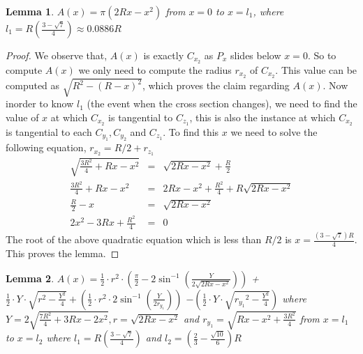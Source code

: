 \documentclass[conference]{IEEEtran}
\newtheorem{lemma}{Lemma}
\begin{document}
\begin{lemma}
$A(x) = \pi(2Rx - x^2)$ from $x = 0$ to $x = l_1$, where $l_1 = R(\frac{3 - \sqrt{7}}{4}) \approx 0.0886R$
\end{lemma}
\begin{proof}
We observe that, $A(x)$ is exactly $C_{x_2}$ as $P_x$ slides below $x = 0$. So to compute $A(x)$ we only need to compute 
the radius $r_{x_2}$ of $C_{x_2}$. This value can be computed as
$\sqrt{R^2 - (R-x)^2} $, which proves the claim regarding $A(x)$. Now inorder to know $l_1$ (the event
when the cross section changes), we need to find the value of $x$ at which $C_{x_2}$ is tangential to $C_{z_1}$, this is also
the instance at which $C_{x_2}$ is tangential to each $ C_{y_1},C_{y_2}$ and $C_{z_1}$. To find this $x$ we need to solve the
following equation, $r_{x_2} = R/2 + r_{z_1}$
\small
\begin{eqnarray*}
\sqrt{\frac{3R^2}{4} + Rx -x^2} &=& \sqrt{2Rx - x^2} + \frac{R}{2} \\
\frac{3R^2}{4} + Rx -x^2 &=& 2Rx-x^2 +\frac{ R^2}{4} + R\sqrt{2Rx - x^2} \\
\frac{R}{2} - x &=&  \sqrt{2Rx -x^2}\\
2x^2 - 3Rx + \frac{R^2}{4} &=& 0
\end{eqnarray*}
The root of the above quadratic equation which is less than $R/2$ is $x = \frac{(3 - \sqrt{7})R}{4}$. This proves the lemma.
\end{proof}


\begin{lemma}
$A(x) =  \frac{1}{2} \cdot r^2 \cdot \left( \frac{\pi}{2} - 2 \sin^{-1} \left( \frac{Y}{2\sqrt{2Rx - x^2}}\right) \right)$  
+ $\frac{1}{2}\cdot Y \cdot \sqrt{r^2 - \frac{Y^2}{4}} + \left( \frac{1}{2}\cdot r^2 \cdot 2 \sin^{-1}\left( \frac{Y}{2r_{y_1}}\right) \right)$ 
$- \left(\frac{1}{2}\cdot Y \cdot  \sqrt{{r_{y_1}}^2 - \frac{Y^2}{4}}\right)$ where $Y = 2\sqrt{\frac{7R^2}{4} + 3Rx -2x^2},
r = \sqrt{2Rx-x^2}$ and $r_{y_1} = \sqrt{Rx-x^2+\frac{3R^2}{4}}$ from $x = l_1$ to $x = l_2$ where 
$l_1 = R(\frac{3 - \sqrt{7}}{4})$ and $l_2 =  (\frac{2}{3} - \frac{\sqrt{10}}{6})R$
\end{lemma}
\end{document}
